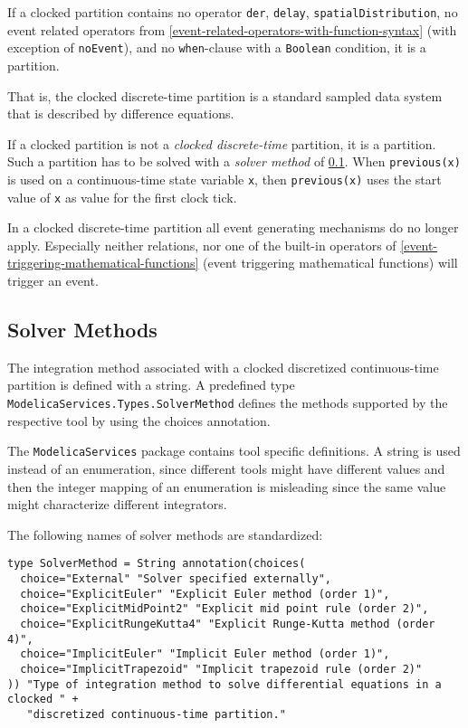 If a clocked partition contains no operator \lstinline!der!,
\lstinline!delay!, \lstinline!spatialDistribution!, no event related operators
from \cref{event-related-operators-with-function-syntax} (with exception of \lstinline!noEvent!), and no
\lstinline!when!-clause with a \lstinline!Boolean! condition, it is a  partition.

\begin{nonnormative}
That is, the clocked discrete-time partition is a standard sampled data system that is described by difference equations.
\end{nonnormative}

If a clocked partition is not a \emph{clocked discrete-time} partition, it
is a  partition. Such a
partition has to be solved with a \emph{solver method} of \cref{solver-methods}.
When \lstinline!previous(x)! is used on a continuous-time state variable \lstinline!x!, then
\lstinline!previous(x)! uses the start value of \lstinline!x! as value for the first clock tick.

In a clocked discrete-time partition all event generating mechanisms do
no longer apply. Especially neither relations, nor one of the built-in
operators of \cref{event-triggering-mathematical-functions} (event triggering mathematical functions)
will trigger an event.

\subsection{Solver Methods}\label{solver-methods}

The integration method associated with a clocked discretized
continuous-time partition is defined with a string. A predefined type
\lstinline!ModelicaServices.Types.SolverMethod! defines the methods supported by the
respective tool by using the choices annotation.

\begin{nonnormative}
The \lstinline!ModelicaServices! package contains tool specific definitions.  A string is used instead of an enumeration, since different tools might have different values and then the
integer mapping of an enumeration is misleading since the same value might characterize different integrators.
\end{nonnormative}

The following names of solver methods are standardized:
\begin{lstlisting}[language=modelica]
type SolverMethod = String annotation(choices(
  choice="External" "Solver specified externally",
  choice="ExplicitEuler" "Explicit Euler method (order 1)",
  choice="ExplicitMidPoint2" "Explicit mid point rule (order 2)",
  choice="ExplicitRungeKutta4" "Explicit Runge-Kutta method (order 4)",
  choice="ImplicitEuler" "Implicit Euler method (order 1)",
  choice="ImplicitTrapezoid" "Implicit trapezoid rule (order 2)"
)) "Type of integration method to solve differential equations in a clocked " +
   "discretized continuous-time partition."
\end{lstlisting}

